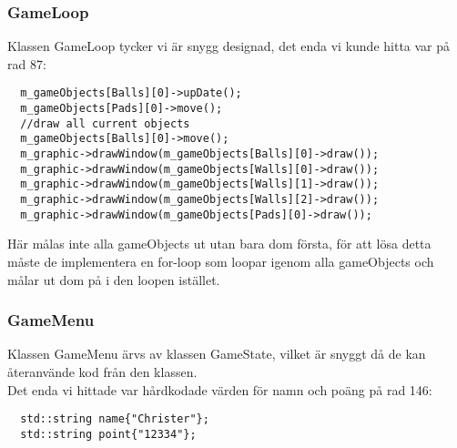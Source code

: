 \documentclass{TDP003mall}
\begin{document}
\subsubsection{GameLoop}
Klassen GameLoop tycker vi är snygg designad, det enda vi kunde hitta var på rad 87: \\
\begin{frame}[Kod]
\begin{lstlisting}
  m_gameObjects[Balls][0]->upDate();
  m_gameObjects[Pads][0]->move();
  //draw all current objects
  m_gameObjects[Balls][0]->move();
  m_graphic->drawWindow(m_gameObjects[Balls][0]->draw());
  m_graphic->drawWindow(m_gameObjects[Walls][0]->draw());
  m_graphic->drawWindow(m_gameObjects[Walls][1]->draw());
  m_graphic->drawWindow(m_gameObjects[Walls][2]->draw());
  m_graphic->drawWindow(m_gameObjects[Pads][0]->draw());
\end{lstlisting}
\end{frame}

Här målas inte alla gameObjects ut utan bara dom första, för att lösa detta måste de implementera en for-loop som loopar igenom alla gameObjects och målar ut dom på i den loopen istället.

\subsubsection{GameMenu}
Klassen GameMenu ärvs av klassen GameState, vilket är snyggt då de kan återanvände kod från den klassen. \\
Det enda vi hittade var hårdkodade värden för namn och poäng på rad 146: \\
\begin{frame}[Kod]
\begin{lstlisting}
  std::string name{"Christer"};
  std::string point{"12334"};
\end{lstlisting}
\end{frame}
\end{document}
